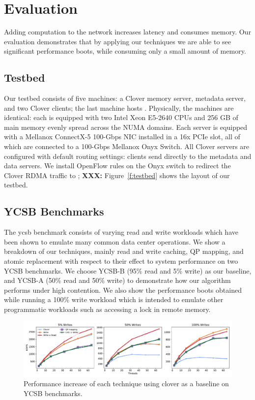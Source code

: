 \section{Evaluation}
\label{s:results}

Adding computation to the network increases latency and consumes memory. Our
evaluation demonstrates that by applying our techniques we are able to see
significant performance boots, while consuming only a small amount of memory.

\subsection{Testbed}


Our testbed consists of five machines: a Clover memory server,
metadata server, and two Clover clients; the last machine hosts
{\sword}. Physically, the machines are identical: each is equipped
with two Intel Xeon E5-2640 CPUs and 256 GB of main memory evenly
spread across the NUMA domains. Each server is equipped with a
Mellanox ConnectX-5 100-Gbps NIC installed in a 16x PCIe slot, all of
which are connected to a 100-Gbps Mellanox Onyx Switch. All Clover
servers are configured with default routing settings: clients send
directly to the metadata and data servers. We install OpenFlow rules
on the Onyx switch to redirect the Clover RDMA traffic to \sword; \textbf{XXX:} Figure~\ref{f:testbed} shows the layout of our
testbed.

\subsection{YCSB Benchmarks}

The ycsb benchmark consists of varying read and write workloads which have been
shown to emulate many common data center operations. We show a breakdown of our
techniques, mainly read and write caching, QP mapping, and atomic replacement
with respect to their effect to system performance on two YCSB benchmarks. We
choose YCSB-B (95\% read and 5\% write) as our baseline, and YCSB-A (50\% read and
50\% write) to demonstrate how our algorithm performs under high contention. We
also show the performance boots obtained while running a 100\% write workload
which is intended to emulate other programmatic workloads such as accessing a
lock in remote memory.

\begin{figure}
    \includegraphics[width=1.0\textwidth]{fig/full_system_performance.pdf}
    \caption{{Performance increase of each technique using clover as a baseline on YCSB benchmarks.}}
    \label{fig:full_system_performance}
\end{figure}

